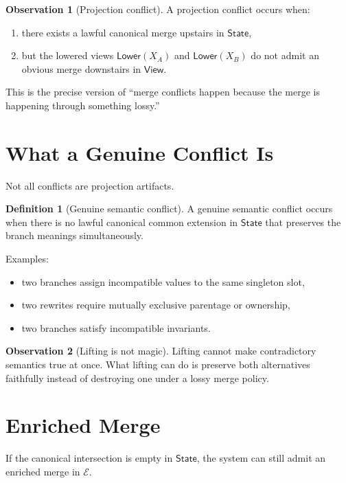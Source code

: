 \documentclass[11pt]{article}
\newcommand{\State}{\ensuremath{\mathsf{State}}}
\newcommand{\View}{\ensuremath{\mathsf{View}}}
\newcommand{\Lower}{\ensuremath{\mathsf{Lower}}}
\newcommand{\Enriched}{\ensuremath{\mathcal{E}}}
\theoremstyle{definition}
\newtheorem{definition}{Definition}
\newtheorem{observation}{Observation}
\begin{document}
\begin{observation}[Projection conflict]
A projection conflict occurs when:
\begin{enumerate}[leftmargin=2em]
\item there exists a lawful canonical merge upstairs in $\State$,
\item but the lowered views $\Lower(X_A)$ and $\Lower(X_B)$ do not admit an
  obvious merge downstairs in $\View$.
\end{enumerate}
\end{observation}

This is the precise version of ``merge conflicts happen because the merge is
happening through something lossy.''

\section{What a Genuine Conflict Is}

Not all conflicts are projection artifacts.

\begin{definition}[Genuine semantic conflict]
A genuine semantic conflict occurs when there is no lawful canonical common
extension in $\State$ that preserves the branch meanings simultaneously.
\end{definition}

Examples:
\begin{itemize}[leftmargin=2em]
\item two branches assign incompatible values to the same singleton slot,
\item two rewrites require mutually exclusive parentage or ownership,
\item two branches satisfy incompatible invariants.
\end{itemize}

\begin{observation}[Lifting is not magic]
Lifting cannot make contradictory semantics true at once. What lifting can do
is preserve both alternatives faithfully instead of destroying one under a
lossy merge policy.
\end{observation}

\section{Enriched Merge}

If the canonical intersection is empty in $\State$, the system can still admit
an enriched merge in $\Enriched$.
\end{document}
